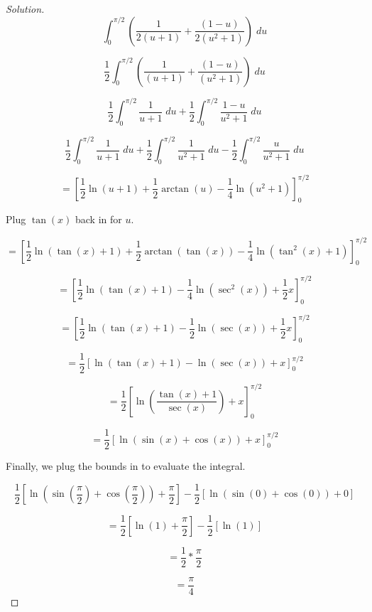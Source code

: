 \documentclass[letterpaper,12pt]{amsart}
\newenvironment{solution}
  {\begin{proof}[Solution]}
  {\end{proof}}
\begin{document}
\begin{solution}
\vspace*{0.15cm}
\[
\int_0^{\pi/2} \left(\frac{1}{2(u+1)} + \frac{(1-u)}{2(u^2+1)}\right)\;du
\]

\vspace*{0.15cm}
\[
\frac{1}{2}\int_0^{\pi/2} \left(\frac{1}{(u+1)} + \frac{(1-u)}{(u^2+1)}\right)\;du
\]

\vspace*{0.15cm}
\[
\frac{1}{2}\int_0^{\pi/2} \frac{1}{u+1}\;du + \frac{1}{2}\int_0^{\pi/2} \frac{1-u}{u^2+1}\;du
\]

\vspace*{0.15cm}
\[
\frac{1}{2}\int_0^{\pi/2} \frac{1}{u+1}\;du + \frac{1}{2}\int_0^{\pi/2} \frac{1}{u^2+1}\;du - \frac{1}{2}\int_0^{\pi/2} \frac{u}{u^2 + 1}\;du
\]

\vspace*{0.15cm}
\[
= \left[\frac{1}{2}\ln{(u+1)} + \frac{1}{2} \arctan{(u)} - \frac{1}{4}\ln{(u^2+1)}\right]_0^{\pi/2}
\]

\vspace*{0.45cm} Plug $\tan(x)$ back in for $u$.\newline

\[
= \left[\frac{1}{2}\ln{(\tan(x)+1)} + \frac{1}{2} \arctan{(\tan(x))} - \frac{1}{4}\ln{(\tan^2(x)+1)}\right]_0^{\pi/2}
\]

\vspace*{0.15cm}
\[
= \left[\frac{1}{2}\ln{(\tan(x)+1)} - \frac{1}{4}\ln{(\sec^2(x))} + \frac{1}{2}x\right]_0^{\pi/2}
\]

\vspace*{0.15cm}
\[
= \left[\frac{1}{2}\ln{(\tan(x)+1)} - \frac{1}{2}\ln{(\sec(x))} + \frac{1}{2}x\right]_0^{\pi/2}
\]

\vspace*{0.15cm}
\[
= \frac{1}{2}\left[\ln(\tan(x) + 1) - \ln(\sec(x)) + x \right]_0^{\pi/2}
\]

\vspace*{0.15cm}
\[
= \frac{1}{2} \left[\ln\left(\frac{\tan(x) + 1}{\sec(x)}\right) + x \right]_0^{\pi/2}
\]

\vspace*{0.15cm}
\[
= \frac{1}{2} \left[\ln(\sin(x) + \cos(x)) + x \right]_0^{\pi/2}
\]

\vspace*{0.45cm} Finally, we plug the bounds in to evaluate the integral.\newline

\[
\frac{1}{2} \left[\ln\left(\sin\left(\frac{\pi}{2}\right) + \cos\left(\frac{\pi}{2}\right)\right) + \frac{\pi}{2} \right] - \frac{1}{2} \left[\ln(\sin(0) + \cos(0)) + 0 \right]
\]

\vspace*{0.15cm}
\[
= \frac{1}{2} \left[\ln(1) + \frac{\pi}{2} \right] - \frac{1}{2} \left[\ln(1) \right]
\]

\vspace*{0.15cm}
\[
= \frac{1}{2} *\frac{\pi}{2} 
\]

\vspace*{0.15cm}
\[
= \frac{\pi}{4}
\]

\end{solution}
 
\end{document}
